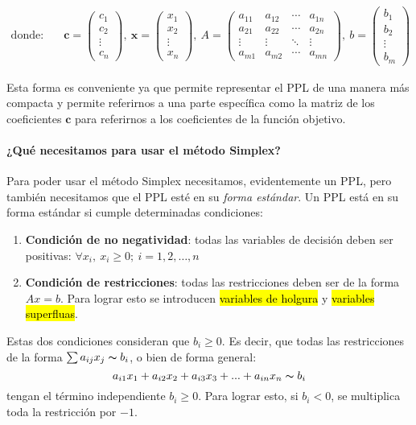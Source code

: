 \begin{align*}
  \text{donde:} \quad       &\mathbf{c} = \begin{pmatrix} c_1 \\ c_2 \\ \vdots \\ c_n \end{pmatrix},\ \mathbf{x} = \begin{pmatrix} x_1 \\ x_2 \\ \vdots \\ x_n \end{pmatrix},\ A = \begin{pmatrix} a_{11} & a_{12} & \cdots & a_{1n} \\ a_{21} & a_{22} & \cdots & a_{2n} \\ \vdots & \vdots & \ddots & \vdots \\ a_{m1} & a_{m2} & \cdots & a_{mn} \end{pmatrix},\ b = \begin{pmatrix} b_1 \\ b_2 \\ \vdots \\ b_m \end{pmatrix}
\end{align*}

Esta forma es conveniente ya que permite representar el PPL de una manera más compacta y permite referirnos a una parte específica como la matriz de los coeficientes \(\mathbf{c}\) para referirnos a los coeficientes de la función objetivo.

\paragraph{¿Qué necesitamos para usar el método Simplex?}

Para poder usar el método Simplex necesitamos, evidentemente un PPL, pero también necesitamos que el PPL esté en su \textit{forma estándar}. Un PPL está en su forma estándar si cumple determinadas condiciones:
\begin{enumerate}
  \item \textbf{Condición de no negatividad}: todas las variables de decisión deben ser positivas: \(\forall x_i,\ x_i \geq 0;\ i = 1,2,\ldots,n\)
  \item \textbf{Condición de restricciones}: todas las restricciones deben ser de la forma \(Ax = b\). Para lograr esto se introducen \hl{variables de holgura} y \hl{variables superfluas}.
\end{enumerate}
Estas dos condiciones consideran que \(b_i \geq 0\). Es decir, que todas las restricciones de la forma \(\sum a_{ij} x_{j} \thicksim b_i\), o bien de forma general:
\[
  a_{i1}x_1 + a_{i2}x_2 + a_{i3}x_3 + ... + a_{in}x_n \thicksim b_i
\]
tengan el término independiente \(b_i \geq 0\). Para lograr esto, si \(b_i < 0\), se multiplica toda la restricción por \(-1\).

